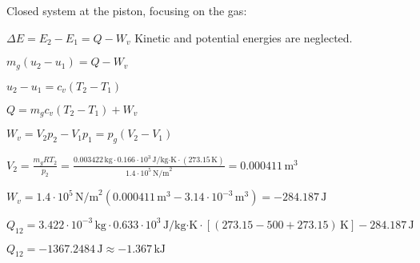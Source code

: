 Closed system at the piston, focusing on the gas:  

\( \Delta E = E_2 - E_1 = Q - W_v \)  
Kinetic and potential energies are neglected.  

\( m_g (u_2 - u_1) = Q - W_v \)  

\( u_2 - u_1 = c_v (T_2 - T_1) \)  

\( Q = m_g c_v (T_2 - T_1) + W_v \)  

\( W_v = V_2 p_2 - V_1 p_1 = p_g (V_2 - V_1) \)  

\( V_2 = \frac{m_g R T_2}{p_2} = \frac{0.003422 \, \text{kg} \cdot 0.166 \cdot 10^3 \, \text{J/kg·K} \cdot (273.15 \, \text{K})}{1.4 \cdot 10^5 \, \text{N/m}^2} = 0.000411 \, \text{m}^3 \)  

\( W_v = 1.4 \cdot 10^5 \, \text{N/m}^2 (0.000411 \, \text{m}^3 - 3.14 \cdot 10^{-3} \, \text{m}^3) = -284.187 \, \text{J} \)  

\( Q_{12} = 3.422 \cdot 10^{-3} \, \text{kg} \cdot 0.633 \cdot 10^3 \, \text{J/kg·K} \cdot [(273.15 - 500 + 273.15) \, \text{K}] - 284.187 \, \text{J} \)  

\( Q_{12} = -1367.2484 \, \text{J} \approx -1.367 \, \text{kJ} \)